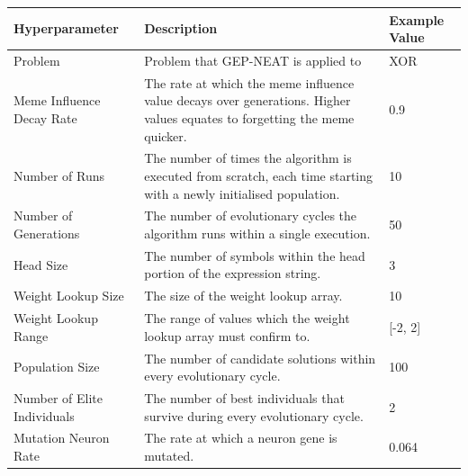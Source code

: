 \begin{xltabular}{\textwidth}{|l|X|l|}
\hline
{} 
\textbf{Hyperparameter}             & \textbf{Description}                                                                                                      & \textbf{Example Value} \\ \hline
\endfirsthead
%
\endhead
%
Problem                             & Problem that GEP-NEAT is applied to                                                                                       & XOR                    \\ \hline
Meme Influence Decay Rate           & The rate at which the meme influence value decays over generations. Higher values equates to forgetting the meme quicker. & 0.9                    \\ \hline
Number of Runs                      & The number of times the algorithm is executed from scratch, each time starting with a newly initialised population.       & 10                     \\ \hline
Number of Generations               & The number of evolutionary cycles the algorithm runs within a single execution.                                           & 50                     \\ \hline
Head Size                           & The number of symbols within the head portion of the expression string.                                                   & 3                      \\ \hline
Weight Lookup Size                  & The size of the weight lookup array.                                                                                      & 10                     \\ \hline
Weight Lookup Range                 & The range of values which the weight lookup array must confirm to.                                                        & {[}-2, 2{]}            \\ \hline
Population Size                     & The number of candidate solutions within every evolutionary cycle.                                                        & 100                    \\ \hline
Number of Elite Individuals         & The number of best individuals that survive during every evolutionary cycle.                                              & 2                      \\ \hline
Mutation Neuron Rate                & The rate at which a neuron gene is mutated.                                                                               & 0.064                  \\ \hline

\end{xltabular}
